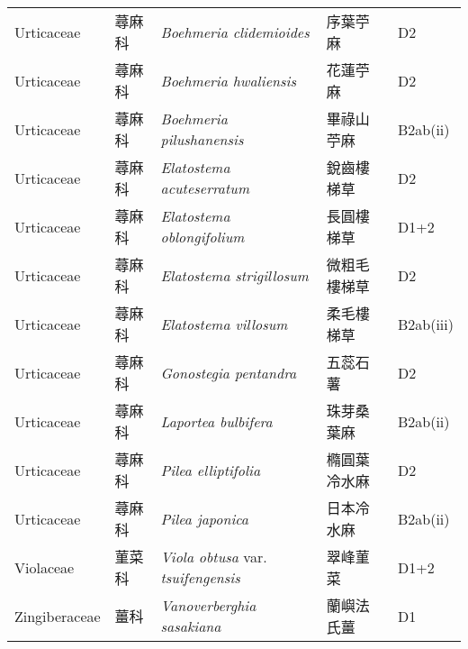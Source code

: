 {\begin{longtable}{p{2.5cm}p{2.5cm}p{4.5cm}p{2.5cm}p{3cm}}
    Urticaceae & 蕁麻科 & \textit{Boehmeria clidemioides}  & 序葉苧麻 & D2 \index{Boehmeria@\textit{Boehmeria}!clidemioides@\textit{clidemioides}}  \index{序葉苧麻} \\
    Urticaceae & 蕁麻科 & \textit{Boehmeria hwaliensis}  & 花蓮苧麻 & D2 \index{Boehmeria@\textit{Boehmeria}!hwaliensis@\textit{hwaliensis}}  \index{花蓮苧麻} \\
    Urticaceae & 蕁麻科 & \textit{Boehmeria pilushanensis}  & 畢祿山苧麻 & B2ab(ii) \index{Boehmeria@\textit{Boehmeria}!pilushanensis@\textit{pilushanensis}}  \index{畢祿山苧麻} \\
    Urticaceae & 蕁麻科 & \textit{Elatostema acuteserratum}  & 銳齒樓梯草 & D2 \index{Elatostema@\textit{Elatostema}!acuteserratum@\textit{acuteserratum}}  \index{銳齒樓梯草} \\
    Urticaceae & 蕁麻科 & \textit{Elatostema oblongifolium}  & 長圓樓梯草 & D1+2 \index{Elatostema@\textit{Elatostema}!oblongifolium@\textit{oblongifolium}}  \index{長圓樓梯草} \\
    Urticaceae & 蕁麻科 & \textit{Elatostema strigillosum}  & 微粗毛樓梯草 & D2 \index{Elatostema@\textit{Elatostema}!strigillosum@\textit{strigillosum}}  \index{微粗毛樓梯草} \\
    Urticaceae & 蕁麻科 & \textit{Elatostema villosum}  & 柔毛樓梯草 & B2ab(iii) \index{Elatostema@\textit{Elatostema}!villosum@\textit{villosum}}  \index{柔毛樓梯草} \\
    Urticaceae & 蕁麻科 & \textit{Gonostegia pentandra}  & 五蕊石薯 & D2 \index{Gonostegia@\textit{Gonostegia}!pentandra@\textit{pentandra}}  \index{五蕊石薯} \\
    Urticaceae & 蕁麻科 & \textit{Laportea bulbifera}  & 珠芽桑葉麻 & B2ab(ii) \index{Laportea@\textit{Laportea}!bulbifera@\textit{bulbifera}}  \index{珠芽桑葉麻} \\
    Urticaceae & 蕁麻科 & \textit{Pilea elliptifolia}  & 橢圓葉冷水麻 & D2 \index{Pilea@\textit{Pilea}!elliptifolia@\textit{elliptifolia}}  \index{橢圓葉冷水麻} \\
    Urticaceae & 蕁麻科 & \textit{Pilea japonica}  & 日本冷水麻 & B2ab(ii) \index{Pilea@\textit{Pilea}!japonica@\textit{japonica}}  \index{日本冷水麻} \\
    Violaceae & 菫菜科 & \textit{Viola obtusa} var. \textit{tsuifengensis}  & 翠峰菫菜 & D1+2 \index{Viola@\textit{Viola}!obtusa@\textit{obtusa}!var. tsuifengensis@var. \textit{tsuifengensis}}  \index{翠峰菫菜} \\
    Zingiberaceae & 薑科 & \textit{Vanoverberghia sasakiana}  & 蘭嶼法氏薑 & D1 \index{Vanoverberghia@\textit{Vanoverberghia}!sasakiana@\textit{sasakiana}}  \index{蘭嶼法氏薑} \\
    \bottomrule
        \end{longtable}
        }
    